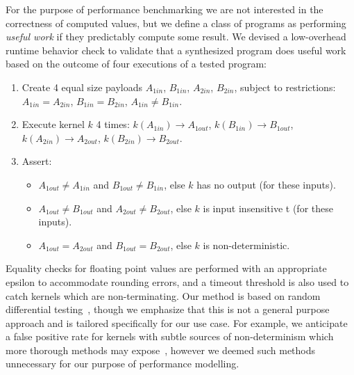For the purpose of performance benchmarking we are not interested in the correctness of computed values, but we define a class of programs as performing \emph{useful work} if they predictably compute some result. We devised a low-overhead runtime behavior check to validate that a synthesized program does useful work based on the outcome of four executions of a tested program:%
%
\begin{enumerate}
\item Create 4 equal size payloads $A_{1in}$, $B_{1in}$, $A_{2in}$,
  $B_{2in}$, subject to restrictions: $A_{1in}=A_{2in}$,
  $B_{1in}=B_{2in}$, $A_{1in} \ne B_{1in}$.
\item Execute kernel $k$ 4 times: $k(A_{1in}) \rightarrow A_{1out}$,
  $k(B_{1in}) \rightarrow B_{1out}$,
  $k(A_{2in}) \rightarrow A_{2out}$,
  $k(B_{2in}) \rightarrow B_{2out}$.
\item Assert:
  \begin{itemize}
  \item $A_{1out} \ne A_{1in}$ and $B_{1out} \ne B_{1in}$, else $k$ has no
  output (for these inputs).%
  \item $A_{1out} \ne B_{1out}$ and $A_{2out} \ne B_{2out}$, else $k$ is input insensitive t (for these inputs).%
  \item $A_{1out}=A_{2out}$ and $B_{1out}=B_{2out}$, else $k$ is
  non-deterministic.
  \end{itemize}
\end{enumerate}
%
\noindent%
Equality checks for floating point values are performed with an appropriate epsilon to accommodate rounding errors, and a timeout threshold is also used to catch kernels which are non-terminating. Our method is based on random differential testing~\cite{McKeeman1998}, though we emphasize that this is not a general purpose approach and is tailored specifically for our use case. For example, we anticipate a false positive rate for kernels with subtle sources of non-determinism which more thorough methods may expose~\cite{Betts2012,Price2015,Sorensen2016}, however we deemed such methods unnecessary for our purpose of performance modelling.